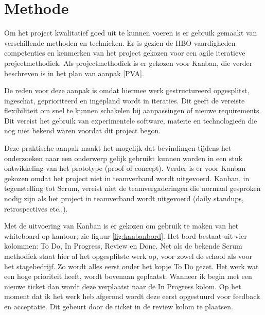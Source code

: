 \chapter{Methode}
Om het project kwalitatief goed uit te kunnen voeren is er gebruik gemaakt van verschillende methoden en technieken. Er is gezien de HBO vaardigheden competenties en kenmerken van het project gekozen voor een agile iteratieve projectmethodiek. Als projectmethodiek is er gekozen voor Kanban, die verder beschreven is in het plan van aanpak [PVA].\par
De reden voor deze aanpak is omdat hiermee werk gestructureerd opgesplitst, ingeschat, geprioriteerd en ingepland wordt in iteraties. Dit geeft de vereiste flexibiliteit om snel te kunnen schakelen bij aanpassingen of nieuwe requirements. Dit vereist het gebruik van experimentele software, materie en technologieën die nog niet bekend waren voordat dit project begon.\par
Deze praktische aanpak maakt het mogelijk dat bevindingen tijdens het onderzoeken naar een onderwerp gelijk gebruikt kunnen worden in een stuk ontwikkeling van het prototype (proof of concept). Verder is er voor Kanban gekozen omdat het project niet in teamverband wordt uitgevoerd. Kanban, in tegenstelling tot Scrum, vereist niet de teamvergaderingen die normaal gesproken nodig zijn als het project in teamverband wordt uitgevoerd (daily standups, retrospectives etc..).\par
Met de uitvoering van Kanban is er gekozen om gebruik te maken van het whiteboard op kantoor, zie figuur \ref{fig:kanbanbord}. Het bord bestaat uit vier kolommen: To Do, In Progress, Review en Done. Net als de bekende Scrum methodiek staat hier al het opgesplitste werk op, voor zowel de school als voor het stagebedrijf. Zo wordt alles eerst onder het kopje To Do gezet. Het werk wat een hoge prioriteit heeft, wordt bovenaan geplaatst. Wanneer ik begin met een nieuwe ticket dan wordt deze verplaatst naar de In Progress kolom. Op het moment dat ik het werk heb afgerond wordt deze eerst opgestuurd voor feedback en acceptatie. Dit gebeurt door de ticket in de review kolom te plaatsen.\par
\newpage

